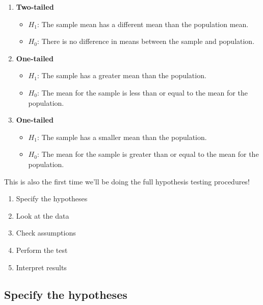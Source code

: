 \documentclass[
]{book}
\providecommand{\tightlist}{%
  \setlength{\itemsep}{0pt}\setlength{\parskip}{0pt}}
\begin{document}
\begin{enumerate}
\def\labelenumi{\arabic{enumi}.}
\item
  \textbf{Two-tailed}

  \begin{itemize}
  \tightlist
  \item
    \(H_1\): The sample mean has a different mean than the population mean.
  \item
    \(H_0\): There is no difference in means between the sample and population.
  \end{itemize}
\item
  \textbf{One-tailed}

  \begin{itemize}
  \tightlist
  \item
    \(H_1\): The sample has a greater mean than the population.
  \item
    \(H_0\): The mean for the sample is less than or equal to the mean for the population.
  \end{itemize}
\item
  \textbf{One-tailed}

  \begin{itemize}
  \tightlist
  \item
    \(H_1\): The sample has a smaller mean than the population.
  \item
    \(H_0\): The mean for the sample is greater than or equal to the mean for the population.
  \end{itemize}
\end{enumerate}

This is also the first time we'll be doing the full hypothesis testing procedures!

\begin{enumerate}
\def\labelenumi{\arabic{enumi}.}
\tightlist
\item
  Specify the hypotheses
\item
  Look at the data
\item
  Check assumptions
\item
  Perform the test
\item
  Interpret results
\end{enumerate}

\hypertarget{specify-the-hypotheses}{%
\subsection{Specify the hypotheses}\label{specify-the-hypotheses}}
\end{document}
